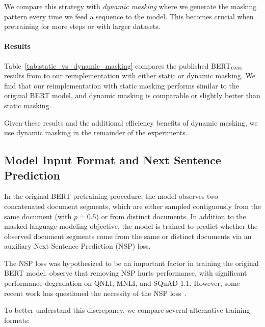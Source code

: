 We compare this strategy with \emph{dynamic masking} where we generate the masking pattern every time we feed a sequence to the model. This becomes crucial when pretraining for more steps or with larger datasets.

\paragraph{Results}

Table~\ref{tab:static_vs_dynamic_masking} compares the published BERT$_{\textsc{base}}$ results from  to our reimplementation with either static or dynamic masking. We find that our reimplementation with static masking performs similar to the original BERT model, and dynamic masking is comparable or slightly better than static masking.

Given these results and the additional efficiency benefits of dynamic masking, we use dynamic masking in the remainder of the experiments.

\subsection{Model Input Format and Next Sentence Prediction} \label{sec:model_input_nsp}

In the original BERT pretraining procedure, the model observes two concatenated document segments, which are either sampled contiguously from the same document (with $p=0.5$) or from distinct documents. In addition to the masked language modeling objective, the model is trained to predict whether the observed document segments come from the same or distinct documents via an auxiliary Next Sentence Prediction (NSP) loss.

The NSP loss was hypothesized to be an important factor in training the original BERT model.  observe that removing NSP hurts performance, with significant performance degradation on QNLI, MNLI, and SQuAD 1.1. However, some recent work has questioned the necessity of the NSP loss~\cite{lample2019cross,yang2019xlnet,joshi2019spanbert}.

To better understand this discrepancy, we compare several alternative training formats:

